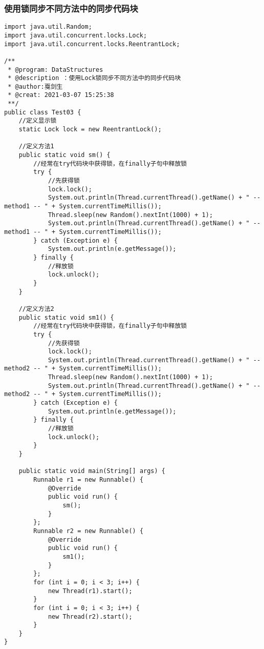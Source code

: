 \documentclass[a4paper]{report}
\begin{document}
\subsubsection{使用锁同步不同方法中的同步代码块}

\begin{Verbatim}[frame=single,numbersep=5pt,xleftmargin=1.5em,xrightmargin=1.5em]
import java.util.Random;
import java.util.concurrent.locks.Lock;
import java.util.concurrent.locks.ReentrantLock;

/**
 * @program: DataStructures
 * @description ：使用Lock锁同步不同方法中的同步代码块
 * @author:戛剑生
 * @creat: 2021-03-07 15:25:38
 **/
public class Test03 {
    //定义显示锁
    static Lock lock = new ReentrantLock();

    //定义方法1
    public static void sm() {
        //经常在try代码块中获得锁，在finally子句中释放锁
        try {
            //先获得锁
            lock.lock();
            System.out.println(Thread.currentThread().getName() + " -- method1 -- " + System.currentTimeMillis());
            Thread.sleep(new Random().nextInt(1000) + 1);
            System.out.println(Thread.currentThread().getName() + " -- method1 -- " + System.currentTimeMillis());
        } catch (Exception e) {
            System.out.println(e.getMessage());
        } finally {
            //释放锁
            lock.unlock();
        }
    }

    //定义方法2
    public static void sm1() {
        //经常在try代码块中获得锁，在finally子句中释放锁
        try {
            //先获得锁
            lock.lock();
            System.out.println(Thread.currentThread().getName() + " -- method2 -- " + System.currentTimeMillis());
            Thread.sleep(new Random().nextInt(1000) + 1);
            System.out.println(Thread.currentThread().getName() + " -- method2 -- " + System.currentTimeMillis());
        } catch (Exception e) {
            System.out.println(e.getMessage());
        } finally {
            //释放锁
            lock.unlock();
        }
    }

    public static void main(String[] args) {
        Runnable r1 = new Runnable() {
            @Override
            public void run() {
                sm();
            }
        };
        Runnable r2 = new Runnable() {
            @Override
            public void run() {
                sm1();
            }
        };
        for (int i = 0; i < 3; i++) {
            new Thread(r1).start();
        }
        for (int i = 0; i < 3; i++) {
            new Thread(r2).start();
        }
    }
}
\end{Verbatim}
\end{document}
